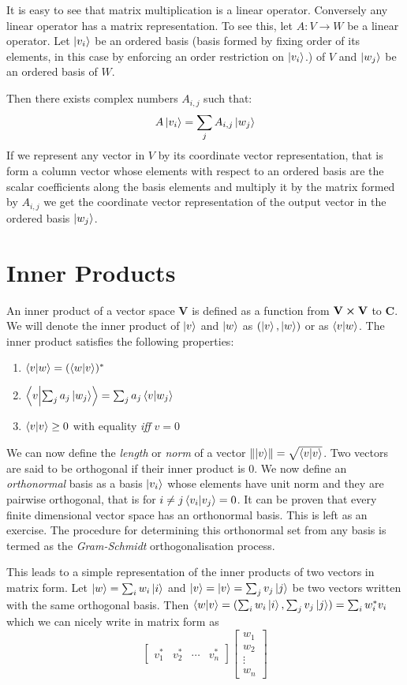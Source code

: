It is easy to see that matrix multiplication is a linear operator. Conversely any linear operator has a matrix representation. To see this, let $A: V \to W$ be a linear operator. Let $\ket{v_{i}}$ be an ordered basis (basis formed by fixing order of its elements, in this case by enforcing an order restriction on $\ket{v_{i}}$.) of $V$ and $\ket{w_{j}}$ be an ordered basis of $W$.

Then there exists complex numbers $A_{i,j}$ such that: $$A\ket{v_{i}} = \sum_{j} A_{i,j}\ket{w_{j}}$$
If we represent any vector in $V$ by its coordinate vector representation, that is form a column vector whose elements with respect to an ordered basis are the scalar coefficients along the basis elements  and multiply it by the matrix formed by $A_{i,j}$ we get the coordinate vector representation of the output vector in the ordered basis $\ket{w_{j}}$.

\section{Inner Products}
An inner product of a vector space \textbf{V} is defined as a function from $\textbf{V} \cross \textbf{V}$ to $\textbf{C}$. We will denote the inner product of $\ket{v}$ and $\ket{w}$ as $(\ket{v}, \ket{w})$ or as $\braket{v}{w}$. The inner product satisfies the following properties:
\begin{enumerate}
    \item $\braket{v}{w} = ({\braket{w}{v}})^{*}$
    \item $\braket{v}{\sum_{j} a_{j} \ket{w_{j}}} = \sum_{j} a_{j} \braket{v}{w_{j}}$
    \item $\braket{v}{v} \geq 0 $ with equality \textit{iff} $v=0$
\end{enumerate}
We can now define the \textit{length} or \textit{norm} of a vector 
$\norm{\ket{v}} = \sqrt{\braket{v}{v}}$. 
Two vectors are said to be orthogonal if their inner product is $0$. 
We now define an \textit{orthonormal} basis as a basis $\ket{v_{i}}$ whose elements have unit norm and they are pairwise orthogonal, that is for $i\neq j \braket{v_i}{v_j} = 0$.
It can be proven that every finite dimensional vector space has an orthonormal basis. This is left as an exercise. The procedure for determining this orthonormal set from any basis is termed as the \textit{Gram-Schmidt} orthogonalisation process.


This leads to a simple representation of the inner products of two vectors in matrix form. Let $\ket{w} = \sum_i w_i \ket{i}$ and $\ket{v} = \ket{v} = \sum_j v_j \ket{j} $ be two vectors written with the same orthogonal basis.
Then $\braket{w}{v} = (\sum_i w_i \ket{i}, \sum_j v_j \ket{j}) = \sum_i w_{i}^*v_i  $ which we can nicely write in matrix form as
$$ \begin{bmatrix} v_1^* & v_2^* & \cdots & v_n^* \end{bmatrix} \begin{bmatrix} w_1 \\ w_2 \\ \vdots \\ w_n \end{bmatrix}$$


